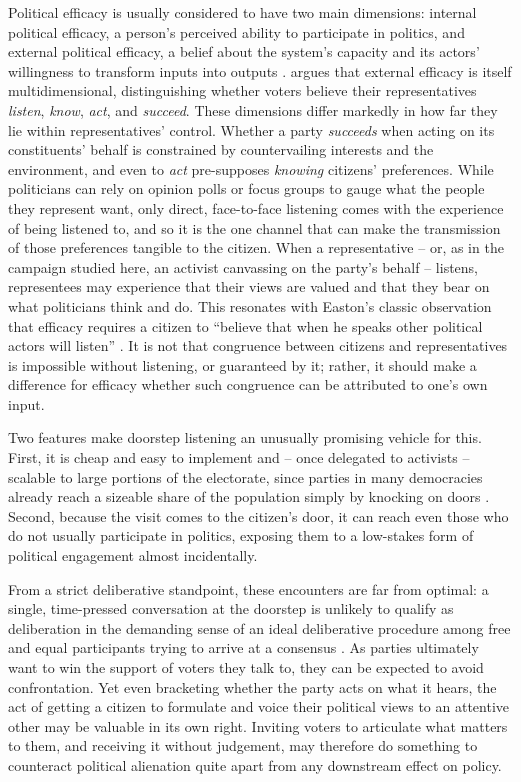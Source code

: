 \documentclass[11pt,a4paper]{scrartcl}
\begin{document}
Political efficacy is usually considered to have two main dimensions: internal political efficacy, a person's perceived ability to participate in politics, and external political efficacy, a belief about the system's capacity and its actors' willingness to transform inputs into outputs \autocites{balchMultipleIndicatorsSurvey1974}{craigMeasuringPoliticalEfficacy1982}. \textcite{demulderMakingSenseCitizens2022} argues that external efficacy is itself multidimensional, distinguishing whether voters believe their representatives \emph{listen}, \emph{know}, \emph{act}, and \emph{succeed}. These dimensions differ markedly in how far they lie within representatives' control. Whether a party \emph{succeeds} when acting on its constituents' behalf is constrained by countervailing interests and the environment, and even to \emph{act} pre-supposes \emph{knowing} citizens' preferences. While politicians can rely on opinion polls or focus groups to gauge what the people they represent want, only direct, face-to-face listening comes with the experience of being listened to, and so it is the one channel that can make the transmission of those preferences tangible to the citizen. When a representative -- or, as in the campaign studied here, an activist canvassing on the party's behalf -- listens, representees may experience that their views are valued and that they bear on what politicians think and do. This resonates with Easton's classic observation that efficacy requires a citizen to \enquote{believe that when he speaks other political actors will listen} \autocite[26]{eastonChildsAcquisitionRegime1967}. It is not that congruence between citizens and representatives is impossible without listening, or guaranteed by it; rather, it should make a difference for efficacy whether such congruence can be attributed to one's own input.

Two features make doorstep listening an unusually promising vehicle for this. First, it is cheap and easy to implement and -- once delegated to activists -- scalable to large portions of the electorate, since parties in many democracies already reach a sizeable share of the population simply by knocking on doors \autocite{daltonPartyMobilizationCampaign2011}. Second, because the visit comes to the citizen's door, it can reach even those who do not usually participate in politics, exposing them to a low-stakes form of political engagement almost incidentally.

From a strict deliberative standpoint, these encounters are far from optimal: a single, time-pressed conversation at the doorstep is unlikely to qualify as deliberation in the demanding sense of an ideal deliberative procedure among free and equal participants trying to arrive at a consensus \autocite{cohenDELIBERATIONDEMOCRATICLEGITIMACY2003}. As parties ultimately want to win the support of voters they talk to, they can be expected to avoid confrontation.
Yet even bracketing whether the party acts on what it hears, the act of getting a citizen to formulate and voice their political views to an attentive other may be valuable in its own right. Inviting voters to articulate what matters to them, and receiving it without judgement, may therefore do something to counteract political alienation quite apart from any downstream effect on policy.
\end{document}
